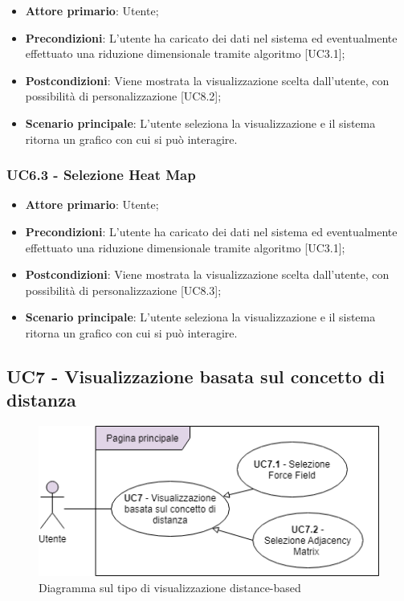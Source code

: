 \begin{itemize}
	\item \textbf{Attore primario}: Utente;
	\item \textbf{Precondizioni}: L'utente ha caricato dei dati nel sistema ed eventualmente effettuato una riduzione dimensionale tramite algoritmo [UC3.1];
	\item \textbf{Postcondizioni}: Viene mostrata la visualizzazione  scelta dall'utente, con possibilità di personalizzazione [UC8.2];
	\item \textbf{Scenario principale}: L'utente seleziona la visualizzazione  e il sistema ritorna un grafico con cui si può interagire.
\end{itemize}

\subsubsection{UC6.3 - Selezione Heat Map}
\begin{itemize}
	\item \textbf{Attore primario}: Utente;
	\item \textbf{Precondizioni}: L'utente ha caricato dei dati nel sistema ed eventualmente effettuato una riduzione dimensionale tramite algoritmo [UC3.1];
	\item \textbf{Postcondizioni}: Viene mostrata la visualizzazione  scelta dall'utente, con possibilità di personalizzazione [UC8.3];
	\item \textbf{Scenario principale}: L'utente seleziona la visualizzazione  e il sistema ritorna un grafico con cui si può interagire.

\end{itemize}

\newpage

\subsection{UC7 - Visualizzazione basata sul concetto di distanza}
\begin{figure}[!htb]
\includegraphics[width=13cm]{Section/Images/UC7.png}
\centering
\caption{Diagramma sul tipo di visualizzazione distance-based}
\end{figure}

